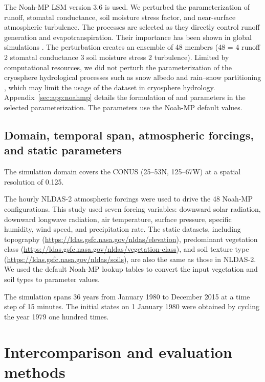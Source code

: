 \documentclass[essd, manuscript]{copernicus}
\begin{document}
The Noah-MP LSM version 3.6 is used. We perturbed the parameterization of runoff, stomatal conductance, soil moisture stress factor, and near-surface atmospheric turbulence. The processes are selected as they directly control runoff generation and evapotranspiration. Their importance has been shown in global simulations \citep{yang2011JGRA}. The perturbation creates an ensemble of 48 members (48 = 4 runoff \times{} 2 stomatal conductance \times{} 3 soil moisture stress \times{} 2 turbulence). Limited by computational resources, we did not perturb the parameterization of the cryosphere hydrological processes such as snow albedo \citep{chen2014JGRA,he2019JGRA} and rain--snow partitioning \citep{wang2019GRL}, which may limit the usage of the dataset in cryosphere hydrology. Appendix~\ref{sec:app:noahmp} details the formulation of and parameters in the selected parameterization. The parameters use the Noah-MP default values.

\subsection{Domain, temporal span, atmospheric forcings, and static parameters}\label{sec:data:static}

The simulation domain covers the CONUS (25\degree{}--53\degree{}N, 125\degree{}--67\degree{}W) at a spatial resolution of 0.125\degree{}.

The hourly NLDAS-2 atmospheric forcings were used to drive the 48 Noah-MP configurations. This study used seven forcing variables: downward solar radiation, downward longwave radiation, air temperature, surface pressure, specific humidity, wind speed, and precipitation rate. The static datasets, including topography (\url{https://ldas.gsfc.nasa.gov/nldas/elevation}), predominant vegetation class (\url{https://ldas.gsfc.nasa.gov/nldas/vegetation-class}), and soil texture type (\url{https://ldas.gsfc.nasa.gov/nldas/soils}), are also the same as those in NLDAS-2. We used the default Noah-MP lookup tables to convert the input vegetation and soil types to parameter values.

The simulation spans 36 years from January 1980 to December 2015 at a time step of 15 minutes. The initial states on 1 January 1980 were obtained by cycling the year 1979 one hundred times.

\section{Intercomparison and evaluation methods}\label{sec:methods}
\end{document}
